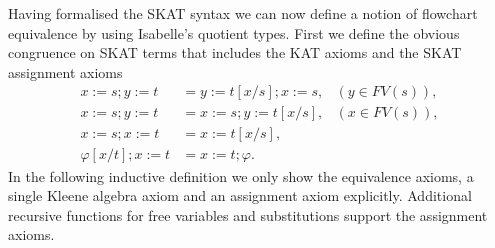 \documentclass{llncs}
\begin{document}
Having formalised the SKAT syntax we can now define a notion of
flowchart equivalence by using Isabelle's quotient types. First we
define the obvious congruence on SKAT terms that includes the KAT
axioms and the SKAT assignment axioms
\begin{align*}
x := s; y := t &= y := t[x/s]; x := s, &(y \in FV(s)),\\
x := s; y := t &= x := s; y := t[x/s], &(x \in FV(s)),\\
x := s; x := t &= x := t[x/s],\\
\varphi[x/t]; x := t &= x := t; \varphi.
\end{align*}
In the following inductive definition we only show the equivalence
axioms, a single Kleene algebra axiom and an assignment axiom
explicitly. Additional recursive functions for free variables and
substitutions support the assignment axioms.
\end{document}
